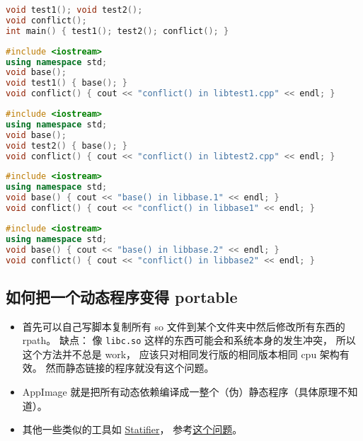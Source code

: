 \begin{lstlisting}[language=cpp, caption=main.cpp]
void test1(); void test2();
void conflict();
int main() { test1(); test2(); conflict(); }
\end{lstlisting}

\begin{lstlisting}[language=cpp, caption=libtest1.cpp]
#include <iostream>
using namespace std;
void base();
void test1() { base(); }
void conflict() { cout << "conflict() in libtest1.cpp" << endl; }
\end{lstlisting}

\begin{lstlisting}[language=cpp, caption=libtest2.cpp]
#include <iostream>
using namespace std;
void base();
void test2() { base(); }
void conflict() { cout << "conflict() in libtest2.cpp" << endl; }
\end{lstlisting}

\begin{lstlisting}[language=cpp, caption=libtest1.cpp]
#include <iostream>
using namespace std;
void base() { cout << "base() in libbase.1" << endl; }
void conflict() { cout << "conflict() in libbase1" << endl; }
\end{lstlisting}

\begin{lstlisting}[language=cpp, caption=libtest2.cpp]
#include <iostream>
using namespace std;
void base() { cout << "base() in libbase.2" << endl; }
void conflict() { cout << "conflict() in libbase2" << endl; }
\end{lstlisting}

\subsection{如何把一个动态程序变得 portable}
\begin{itemize}
\item 首先可以自己写脚本复制所有 so 文件到某个文件夹中然后修改所有东西的 rpath。 缺点： 像 \verb|libc.so| 这样的东西可能会和系统本身的发生冲突， 所以这个方法并不总是 work， 应该只对相同发行版的相同版本相同 cpu 架构有效。 然而静态链接的程序就没有这个问题。
\item AppImage 就是把所有动态依赖编译成一整个（伪）静态程序（具体原理不知道）。
\item 其他一些类似的工具如 \href{https://statifier.sourceforge.net/}{Statifier}， 参考\href{https://askubuntu.com/questions/537479/is-there-any-open-source-way-to-make-a-static-from-a-dynamic-executable-with-no}{这个问题}。
\end{itemize}
